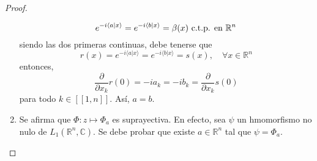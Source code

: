 \documentclass[12pt]{report}
\newcounter{it}
\theoremstyle{largebreak}
\newcommand\pint[2]{\ensuremath{\langle#1| #2\rangle}}
\newcommand{\natint}[1]{\ensuremath{\left[\!\left[#1\right]\!\right]}}
\begin{document}
\begin{proof}
\begin{enumerate}
            \begin{equation*}
                e^{ -i\pint{a}{x}}=e^{ -i\pint{b}{x}}=\beta(x)\textup{ c.t.p. en }\mathbb{R}^n
            \end{equation*}
            siendo las dos primeras continuas, debe tenerse que
            \begin{equation*}
                r(x)=e^{ -i\pint{a}{x}}=e^{ -i\pint{b}{x}}=s(x),\quad\forall x\in\mathbb{R}^n
            \end{equation*}
            entonces,
            \begin{equation*}
                \frac{\partial}{\partial x_k}r(0)=-ia_k=-ib_k=\frac{\partial}{\partial x_k}s(0)
            \end{equation*}
            para todo $k\in\natint{1,n}$. Así, $a=b$.
            \item Se afirma que $\Phi:z\mapsto\Phi_a$ es suprayectiva. En efecto, sea $\psi$ un hmomorfismo no nulo de $L_1(\mathbb{R}^n,\mathbb{C})$. Se debe probar que existe $a\in\mathbb{R}^n$ tal que $\psi=\Phi_a$.
            

\end{enumerate}
\end{proof}
\end{document}
